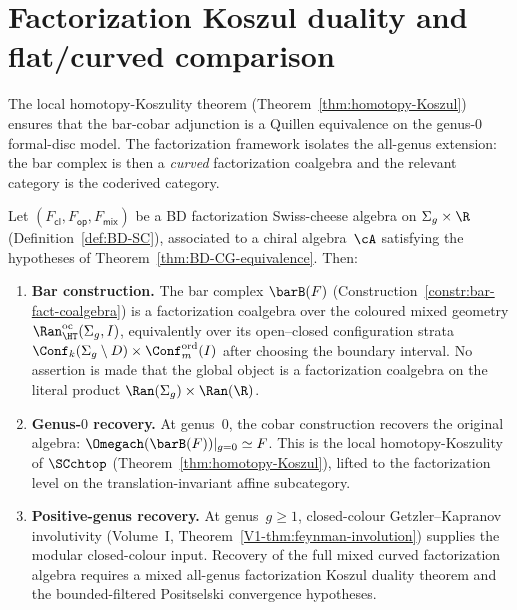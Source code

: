 \section{Factorization Koszul duality and flat/curved comparison}
\label{sec:factorization-koszul-duality}

The local homotopy-Koszulity theorem
(Theorem~\ref{thm:homotopy-Koszul}) ensures that the bar-cobar
adjunction is a Quillen equivalence on the genus-$0$ formal-disc
model. The factorization framework isolates the all-genus extension:
the bar complex is then a \emph{curved} factorization coalgebra and
the relevant category is the coderived category.

\begin{theorem}
\label{thm:factorization-SC-koszul}
Let $(F_{\mathsf{cl}}, F_{\mathsf{op}}, F_{\mathsf{mix}})$ be a
BD factorization Swiss-cheese algebra on $\Sigma_g \times \R$
\textup{(}Definition~\textup{\ref{def:BD-SC})}, associated to a
chiral algebra~$\cA$ satisfying the hypotheses of
Theorem~\textup{\ref{thm:BD-CG-equivalence}}. Then:
\begin{enumerate}[label=\textup{(\roman*)}]
\item \textbf{Bar construction.} The bar complex
 $\barB(F)$ \textup{(}Construction~\textup{\ref{constr:bar-fact-coalgebra})}
 is a factorization coalgebra over the coloured mixed geometry
 $\Ran^{\mathrm{oc}}_{\HT}(\Sigma_g,I)$, equivalently over its
 open--closed configuration strata
 $\Conf_k(\Sigma_g\setminus D)\times\Conf_m^{\mathrm{ord}}(I)$
 after choosing the boundary interval. No assertion is made that
 the global object is a factorization coalgebra on the literal
 product $\Ran(\Sigma_g)\times\Ran(\R)$.

\item \textbf{Genus-$0$ recovery.} At genus~$0$, the cobar
 construction recovers the original algebra:
 $\Omegach(\barB(F))|_{g=0} \simeq F$. This is the local
 homotopy-Koszulity of $\SCchtop$
 \textup{(}Theorem~\textup{\ref{thm:homotopy-Koszul})}, lifted to
 the factorization level on the translation-invariant affine
 subcategory.

\item \textbf{Positive-genus recovery.} At genus~$g \geq 1$,
 closed-colour Getzler--Kapranov involutivity
 \textup{(}Volume~I, Theorem~\textup{\ref*{V1-thm:feynman-involution})}
 supplies the modular closed-colour input. Recovery of the full
 mixed curved factorization algebra requires a mixed
 all-genus factorization Koszul duality theorem and the
 bounded-filtered Positselski convergence hypotheses.


\end{enumerate}
\end{theorem}
